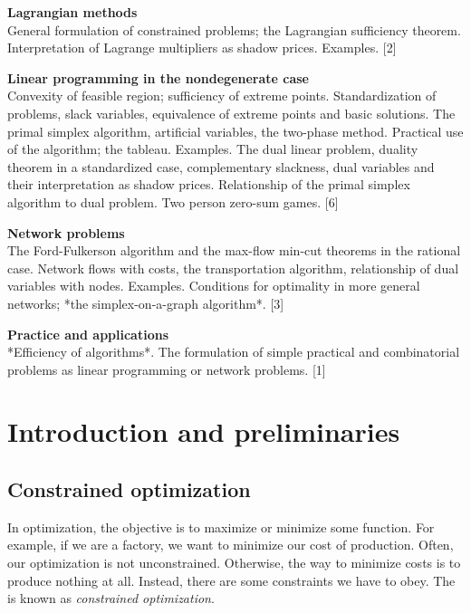 \documentclass[a4paper]{article}
\begin{document}
\maketitle
{\small
\noindent\textbf{Lagrangian methods}\\
General formulation of constrained problems; the Lagrangian sufficiency theorem.  Interpretation of Lagrange multipliers as shadow prices. Examples.\hspace*{\fill} [2]

\vspace{10pt}
\noindent\textbf{Linear programming in the nondegenerate case}\\
Convexity of feasible region; sufficiency of extreme points. Standardization of problems, slack variables, equivalence of extreme points and basic solutions. The primal simplex algorithm, artificial variables, the two-phase method. Practical use of the algorithm; the tableau. Examples. The dual linear problem, duality theorem in a standardized case, complementary slackness, dual variables and their interpretation as shadow prices. Relationship of the primal simplex algorithm to dual problem. Two person zero-sum games.\hspace*{\fill} [6]

\vspace{10pt}
\noindent\textbf{Network problems}\\
The Ford-Fulkerson algorithm and the max-flow min-cut theorems in the rational case. Network flows with costs, the transportation algorithm, relationship of dual variables with nodes. Examples. Conditions for optimality in more general networks; *the simplex-on-a-graph algorithm*.\hspace*{\fill} [3]

\vspace{10pt}
\noindent\textbf{Practice and applications}\\
*Efficiency of algorithms*. The formulation of simple practical and combinatorial problems as linear programming or network problems.\hspace*{\fill} [1]}

\tableofcontents

\section{Introduction and preliminaries}
\subsection{Constrained optimization}
In optimization, the objective is to maximize or minimize some function. For example, if we are a factory, we want to minimize our cost of production. Often, our optimization is not unconstrained. Otherwise, the way to minimize costs is to produce nothing at all. Instead, there are some constraints we have to obey. The is known as \emph{constrained optimization}.
\end{document}
